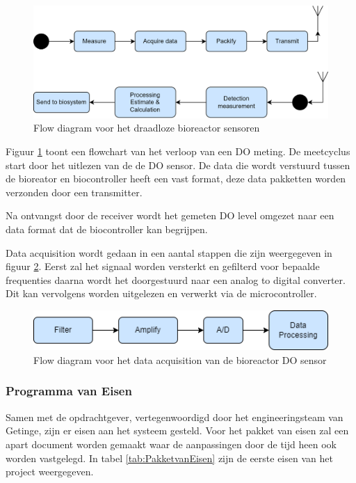 \begin{figure}[H]
	\centering
	\includegraphics[width=0.60\linewidth]{graphics/probe_flow_simple}
	\caption{Flow diagram voor het draadloze bioreactor sensoren}
	\label{fig:probe_flow_simple}
\end{figure}

Figuur \ref{fig:probe_flow_simple} toont een flowchart van het verloop van een DO meting. De meetcyclus start door het uitlezen van de de DO sensor. De data die wordt verstuurd tussen de bioreator en biocontroller heeft een vast format, deze data pakketten worden verzonden door een transmitter. 

Na ontvangst door de receiver wordt het gemeten DO level omgezet naar een data format dat de biocontroller kan begrijpen. 

Data acquisition wordt gedaan in een aantal stappen die zijn weergegeven in figuur \ref{fig:acq_flow}. Eerst zal het signaal worden versterkt en gefilterd voor bepaalde frequenties daarna wordt het doorgestuurd naar een analog to digital converter. Dit kan vervolgens worden uitgelezen en verwerkt via de microcontroller.  

\begin{figure}[H]
	\centering
	\includegraphics[width=0.55\linewidth]{graphics/acquisition_flow}
	\caption{Flow diagram voor het data acquisition van de bioreactor DO sensor}
	\label{fig:acq_flow}
\end{figure}


\subsubsection{Programma van Eisen}
Samen met de opdrachtgever, vertegenwoordigd door het engineeringsteam van Getinge, zijn er eisen aan het systeem gesteld. Voor het pakket van eisen zal een apart document worden gemaakt waar de aanpassingen door de tijd heen ook worden vastgelegd. In tabel \ref{tab:PakketvanEisen} zijn de eerste eisen van het project weergegeven. 

